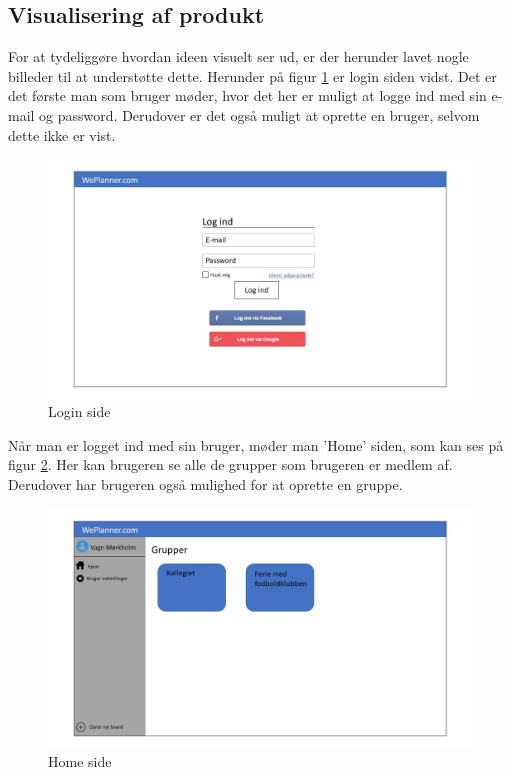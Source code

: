 \subsection{Visualisering af produkt}
For at tydeliggøre hvordan ideen visuelt ser ud, er der herunder lavet nogle billeder til at understøtte dette. Herunder på figur \ref{fig:login_site} er login siden vidst. Det er det første man som bruger møder, hvor det her er muligt at logge ind med sin e-mail og password. Derudover er det også muligt at oprette en bruger, selvom dette ikke er vist.
\begin{figure}[H]
  \includegraphics[width=\linewidth]{01_Indledning/Images/Slide1.JPG}
  \caption{Login side}
  \label{fig:login_site}
\end{figure}

\noindent Når man er logget ind med sin bruger, møder man 'Home' siden, som kan ses på figur \ref{fig:home_site}. Her kan brugeren se alle de grupper som brugeren er medlem af. Derudover har brugeren også mulighed for at oprette en gruppe.
\begin{figure}[H]
  \includegraphics[width=\linewidth]{01_Indledning/Images/Slide2.JPG}
  \caption{Home side}
  \label{fig:home_site}
\end{figure}

